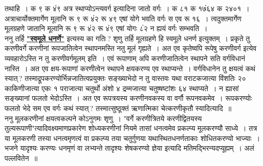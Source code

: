 \documentclass[11pt, openany]{book}
\begin{document}
\noindent तथाहि~। क ९ क ४ं९ अत्र स्थाप्योऽन्त्यवर्ग इत्यादिना जातो वर्गः~। क ८१ क १७ं६४ क २४०१~। अत्राचार्योक्तमार्गेण मूलानि रू ९ रू ४ं२ 
रू ४९ एषां योगे भवति वर्गः स एव रू १६~। त्वदुक्तमार्गेण मूलग्रहणे जातानि मूलानि रू ९ रू ४ं२ रू ४ं९ एषां योगः ८ं२ न ह्ययं 
वर्गः सम्भवति~। \\

\vspace{-3mm}
 ननु तर्हि \hyperref[1.4]{\textbf{"स्वमूले धनर्णे"}} इत्यस्य का गतिः\,? शृणु तर्हि मूलग्रहणे हि स्वमूले धनर्ण इत्युक्तम्~। प्रकृते तु करणीवर्गे करणीनां रूपजातित्वेन स्थापनमस्ति नतु मूलं गृह्यते~। अत एव कृतेष्वपि 
रूपेषु करणीवर्ग इत्येव व्यवहारोऽस्ति न तु करणीवर्गमूलम् इति~। 
एवं रूपाणाम् अपि करणीजातित्वेन स्थापने सति वर्गविधानं नास्ति~। 
अत एव क्षय-रूपाणां करणीत्वेन स्थापने क्षयकरण्य एव स्थाप्यन्ते~। 
वर्गविधानेन तु क्षयत्वं कथं स्यात्\,? तस्माद्रूपकरण्योर्भिन्नजातित्वप्रयुक्तः सङ्ख्याभेदो न तु वास्तवः यथा वराटकजात्या विंशतिः २० काकिणीजात्या 
एकः १ पराजात्या चतुर्थो अंशो ४ द्रम्मजात्या चतुष्षष्टांशः ६४ 
स्थाप्यते~। न ह्यासां सङ्ख्यानां फलतो भेदोऽस्ति~। अत एव 
रूपत्रयस्य करणीनवकस्य वा वर्गौ रूपनवकमेव~। रूपकरण्योः फलतो 
भेदे सम एव वर्गः कथं स्यात्\,? तस्मात्सुष्ठूक्तं ऋणात्मिका चेत्करणीकृतौ स्यादित्यादि~॥ \\

\vspace{-3mm}
 ननु मूलकरणीनां क्षयत्वकल्पने कोऽनुगमः शृणु~। {\qt "वर्गे करणीत्रितये करणीद्वितयस्य तुल्यरूपाणी"}त्यादिवक्ष्यमाणप्रकारेण
शोध्यकरणीनां नियमे तासां धनत्वमेव प्रकल्प्य मूलकरण्यौ साध्ये~। तत्र या मूलकरणी 
तस्या धनत्वमृणत्वं वा प्रकल्प्य तया चतुर्गुणया यथास्थितधनर्णताकाः 
शोधितकरण्यो भाज्याः~। भजने यादृश्यः करण्यः धनमृणं वा लभ्यन्ते 
तादृश्यः शेषकरण्यो ज्ञेया इत्यादि मतिमद्भिरन्यदप्यूह्यम्~। अलं पल्लवितेन~॥
\newpage%
\end{document}
